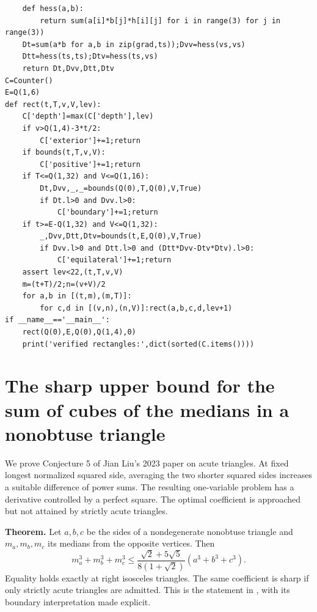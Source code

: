 \documentclass[11pt,a4paper]{article}
\numberwithin{equation}{section}
\theoremstyle{definition}
\theoremstyle{remark}
\newenvironment{sectionabstract}{\par\smallskip\begingroup\small\noindent}{\par\endgroup\medskip}
\begin{document}
\begin{Verbatim}
    def hess(a,b):
        return sum(a[i]*b[j]*h[i][j] for i in range(3) for j in range(3))
    Dt=sum(a*b for a,b in zip(grad,ts));Dvv=hess(vs,vs)
    Dtt=hess(ts,ts);Dtv=hess(ts,vs)
    return Dt,Dvv,Dtt,Dtv
C=Counter()
E=Q(1,6)
def rect(t,T,v,V,lev):
    C['depth']=max(C['depth'],lev)
    if v>Q(1,4)-3*t/2:
        C['exterior']+=1;return
    if bounds(t,T,v,V):
        C['positive']+=1;return
    if T<=Q(1,32) and V<=Q(1,16):
        Dt,Dvv,_,_=bounds(Q(0),T,Q(0),V,True)
        if Dt.l>0 and Dvv.l>0:
            C['boundary']+=1;return
    if t>=E-Q(1,32) and V<=Q(1,32):
        _,Dvv,Dtt,Dtv=bounds(t,E,Q(0),V,True)
        if Dvv.l>0 and Dtt.l>0 and (Dtt*Dvv-Dtv*Dtv).l>0:
            C['equilateral']+=1;return
    assert lev<22,(t,T,v,V)
    m=(t+T)/2;n=(v+V)/2
    for a,b in [(t,m),(m,T)]:
        for c,d in [(v,n),(n,V)]:rect(a,b,c,d,lev+1)
if __name__=='__main__':
    rect(Q(0),E,Q(0),Q(1,4),0)
    print('verified rectangles:',dict(sorted(C.items())))
\end{Verbatim}
\endgroup

\par\endgroup

\begingroup

\section{\texorpdfstring{The sharp upper bound for the sum of cubes of the medians in a nonobtuse triangle}{The sharp upper bound for the sum of cubes of the medians in a nonobtuse triangle}}\label{section:r41keio}
\par\medskip


\begin{sectionabstract}
We prove Conjecture 5 of Jian Liu's 2023 paper on acute triangles. At fixed longest normalized squared side, averaging the two shorter squared sides increases a suitable difference of power sums. The resulting one-variable problem has a derivative controlled by a perfect square. The optimal coefficient is approached but not attained by strictly acute triangles.
\end{sectionabstract}

\textbf{Theorem.} Let $a,b,c$ be the sides of a nondegenerate nonobtuse triangle and $m_a,m_b,m_c$ its medians from the opposite vertices. Then
\[
 m_a^3+m_b^3+m_c^3\le
 \frac{\sqrt2+5\sqrt5}{8(1+\sqrt2)}(a^3+b^3+c^3).
\]
Equality holds exactly at right isosceles triangles. The same coefficient is sharp if only strictly acute triangles are admitted. This is the statement in \cite[Conjecture 5, (4.5)]{r41keio:liu}, with its boundary interpretation made explicit.
\end{document}
